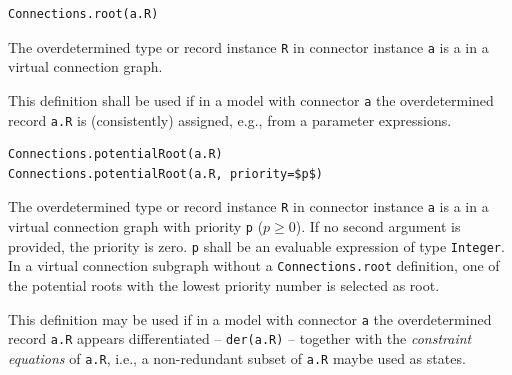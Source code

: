 \begin{operatordefinition}
\begin{synopsis}\begin{lstlisting}
Connections.root(a.R)
\end{lstlisting}\end{synopsis}
\begin{semantics}
The overdetermined type or record instance \lstinline!R! in connector instance \lstinline!a! is a  in a virtual connection graph.

\begin{nonnormative}
This definition shall be used if in a model with connector \lstinline!a! the overdetermined record \lstinline!a.R! is (consistently) assigned, e.g., from a parameter expressions.
\end{nonnormative}
\end{semantics}
\end{operatordefinition}

\begin{operatordefinition}
\begin{synopsis}\begin{lstlisting}
Connections.potentialRoot(a.R)
Connections.potentialRoot(a.R, priority=$p$)
\end{lstlisting}\end{synopsis}
\begin{semantics}
The overdetermined type or record instance \lstinline!R! in connector instance \lstinline!a! is a  in a virtual connection graph with priority \lstinline!p! ($p \geq 0$).
If no second argument is provided, the priority is zero.
\lstinline!p! shall be an evaluable expression of type \lstinline!Integer!.
In a virtual connection subgraph without a \lstinline!Connections.root! definition, one of the potential roots with the lowest priority number is selected as root.

\begin{nonnormative}
This definition may be used if in a model with connector \lstinline!a! the overdetermined record \lstinline!a.R! appears differentiated -- \lstinline!der(a.R)! -- together with the \emph{constraint equations} of \lstinline!a.R!, i.e., a non-redundant subset of \lstinline!a.R! maybe used as states.
\end{nonnormative}
\end{semantics}
\end{operatordefinition}

